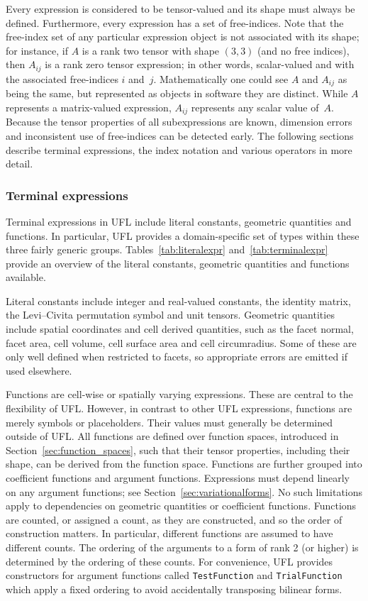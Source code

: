 \documentclass[prodmode,acmtoms]{acmsmall}
\newcommand{\uflc}[1]{\texttt{#1}}
\begin{document}
Every expression is considered to be tensor-valued and its shape
must always be defined. Furthermore, every expression has a set of
free-indices.  Note that the free-index set of any particular expression
object is not associated with its shape; for instance, if $A$ is a rank
two tensor with shape $(3,3)$ (and no free indices), then $A_{ij}$ is
a rank zero tensor expression; in other words, scalar-valued and with
the associated free-indices $i$ and~$j$.  Mathematically one could
see $A$ and $A_{ij}$ as being the same, but represented as objects
in software they are distinct.  While $A$ represents a matrix-valued
expression, $A_{ij}$ represents any scalar value of~$A$. Because the
tensor properties of all subexpressions are known, dimension errors and
inconsistent use of free-indices can be detected early. The following
sections describe terminal expressions, the index notation and various
operators in more detail.

\subsubsection{Terminal expressions}

Terminal expressions in UFL include literal constants, geometric
quantities and functions. In particular, UFL provides a
domain-specific set of types within these three fairly generic groups.
Tables~\ref{tab:literalexpr} and~\ref{tab:terminalexpr} provide an overview of the literal
constants, geometric quantities and functions available.

Literal constants include integer and real-valued constants, the
identity matrix, the Levi--Civita permutation symbol and unit
tensors. Geometric quantities include spatial coordinates and cell
derived quantities, such as the facet normal, facet area, cell volume,
cell surface area and cell circumradius. Some of these are only well
defined when restricted to facets, so appropriate errors are emitted
if used elsewhere.

Functions are cell-wise or spatially varying expressions. These are
central to the flexibility of UFL. However, in contrast to other UFL
expressions, functions are merely symbols or placeholders. Their values
must generally be determined outside of UFL. All functions are defined
over function spaces, introduced in Section~\ref{sec:function_spaces},
such that their tensor properties, including their shape, can be derived
from the function space. Functions are further grouped into coefficient
functions and argument functions. Expressions must depend linearly on
any argument functions; see Section~\ref{sec:variationalforms}. No
such limitations apply to dependencies on geometric quantities or
coefficient functions. Functions are counted, or assigned a count,
as they are constructed, and so the order of construction matters. In
particular, different functions are assumed to have different counts.
The ordering of the arguments to a form of rank 2 (or higher) is
determined by the ordering of these counts.
For convenience, UFL provides constructors for argument functions called
\uflc{TestFunction} and \uflc{TrialFunction} which apply a fixed
ordering to avoid accidentally transposing bilinear forms.
\end{document}
